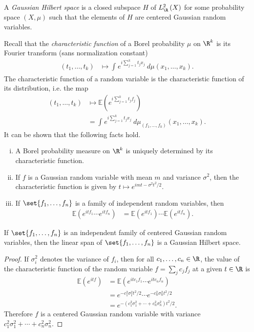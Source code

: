 \documentclass[10pt]{mypackage}
\begin{document}
\begin{definition}
  A \textit{Gaussian Hilbert space} is a closed subspace $H$ of $L^2_{\R}\left( X \right)$ for some probability space $\left( X,\mu \right)$ such that the elements of $H$ are centered Gaussian random variables.
\end{definition}
Recall that the \textit{characteristic function} of a Borel probability $\mu$ on $\R^{k}$ is its Fourier transform (sans normalization constant)
\begin{align*}
  \left( t_1,\dots,t_k \right) &\mapsto \int_{}^{} e^{i\sum_{j=1}^{k}t_jx_j}\:d\mu\left( x_1,\dots,x_k \right).
\end{align*}
The characteristic function of a random variable is the characteristic function of its distribution, i.e. the map
\begin{align*}
  \left( t_1,\dots,t_k \right) &\mapsto \mathbb{E}\left( e^{i\sum_{j=1}^{k}t_jf_j} \right)\\
                               &= \int_{}^{} e^{i\sum_{j=1}^{k}t_jx_j}\:d\mu_{\left( f_1,\dots,f_k \right)}\left( x_1,\dots,x_k \right).
\end{align*}
It can be shown that the following facts hold.
\begin{enumerate}[(i)]
  \item A Borel probability measure on $\R^k$ is uniquely determined by its characteristic function.
  \item If $f$ is a Gaussian random variable with mean $m$ and variance $\sigma^2$, then the characteristic function is given by $t\mapsto e^{imt-\sigma^2t^2/2}$.
  \item If $\set{f_1,\dots,f_n}$ is a family of independent random variables, then
    \begin{align*}
      \mathbb{E}\left( e^{itf_1}\cdots e^{itf_n} \right) &= \mathbb{E}\left( e^{itf_1} \right)\cdots \mathbb{E}\left( e^{itf_n} \right).
    \end{align*}
\end{enumerate}
\begin{proposition}
  If $\set{f_1,\dots,f_n}$ is an independent family of centered Gaussian random variables, then the linear span of $\set{f_1,\dots,f_n}$ is a Gaussian Hilbert space.
\end{proposition}
\begin{proof}
  If $\sigma_i^2$ denotes the variance of $f_i$, then for all $c_1,\dots,c_n\in \R$, the value of the characteristic function of the random variable $f = \sum_{j}c_jf_j$ at a given $t\in \R$ is
  \begin{align*}
    \mathbb{E}\left( e^{itf} \right) &= \mathbb{E}\left( e^{itc_1f_1}\cdots e^{itc_nf_n} \right)\\
                                     &= e^{-c_1^2\sigma_1^2t^2/2}\cdots e^{-c_n^2\sigma_n^2t^2/2}\\
                                     &= e^{-\left( c_1^2\sigma_1^2+\cdots+c_n^2\sigma_n^2 \right)t^2/2}.
  \end{align*}
  Therefore $f$ is a centered Gaussian random variable with variance $c_1^2\sigma_1^2 + \cdots + c_n^2\sigma_n^2$.
\end{proof}
\end{document}
